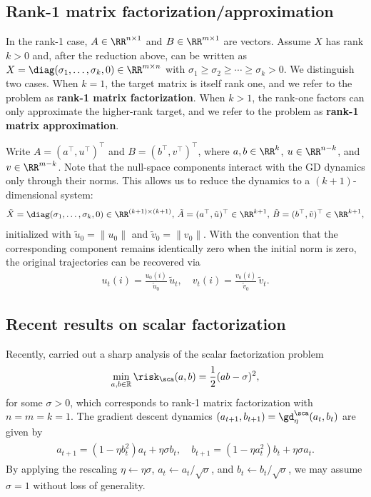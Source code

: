 \documentclass{article}
\begin{document}
\subsection{Rank-1 matrix factorization/approximation}\label{subsec:rank 1 matrix factorization}
In the rank-1 case, $A\in\RR^{n\times 1}$ and $B\in\RR^{m\times 1}$ are vectors.
Assume $X$ has rank $k>0$ and, after the reduction above, can be written as
$X=\diag(\sigma_1,\dots,\sigma_k,0)\in\RR^{m\times n}$
with $\sigma_1\ge \sigma_2\ge \cdots \ge \sigma_k>0$.
We distinguish two cases. When $k=1$, the target matrix is itself rank one, and
we refer to the problem as \textbf{rank-1 matrix factorization}. When $k>1$,
the rank-one factors can only approximate the higher-rank target, and we refer
to the problem as \textbf{rank-1 matrix approximation}.

Write $A=(a^\top,u^\top)^\top$ and $B=(b^\top,v^\top)^\top$,
where $a,b\in\RR^k$, $u\in\RR^{n-k}$, and $v\in\RR^{m-k}$. 
Note that the null-space components interact with the GD dynamics only through their norms. This allows us to reduce the dynamics to a $(k+1)$-dimensional system:
\begin{align}
    \tilde X = \diag(\sigma_1,\dots,\sigma_k,0)\in\RR^{(k+1)\times (k+1)},\,
    \tilde A = (a^\top,\tilde u)^\top\in\RR^{k+1},\,
    \tilde B = (b^\top,\tilde v)^\top\in\RR^{k+1},
\end{align}
initialized with $\tilde u_0=\|u_0\|$ and $\tilde v_0=\|v_0\|$.
With the convention that the corresponding component remains identically zero when the initial norm is zero, the original trajectories can be recovered via
\begin{align}
    u_t(i)=\frac{u_0(i)}{\tilde u_0}\,\tilde u_t,\quad v_t(i)=\frac{v_0(i)}{\tilde v_0}\,\tilde v_t.
\end{align}

\subsection{Recent results on scalar factorization}\label{subsec:liang_summary}
Recently, \cite{liang2025gradient} carried out a sharp analysis of the scalar factorization problem \begin{align} \min_{a,b \in\mathbb R} \risk_\sca (a,b) = \frac 1 2 (ab- \sigma)^2, \end{align} for some $\sigma > 0$, which corresponds to rank-1 matrix factorization with $n = m = k = 1$. The gradient descent dynamics $(a_{t+1},b_{t+1}) = \gd_\eta^\sca (a_t,b_t)$ are given by \begin{align} \begin{aligned} a_{t+1} = (1-\eta b_t^2) a_t + \eta\sigma b_t, \quad b_{t+1} = (1- \eta a_t^2)b_t + \eta \sigma a_t. \end{aligned}\label{eq:scalar_vector_gd} \end{align} 
By applying the rescaling $\eta \leftarrow \eta \sigma$, $a_t \leftarrow a_t/\sqrt{\sigma}$, and $b_t \leftarrow b_t/\sqrt{\sigma}$, we may assume $\sigma = 1$ without loss of generality.
\end{document}
